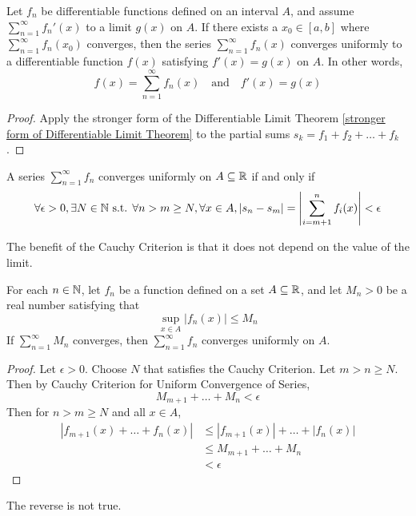\documentclass[11pt]{article}
\begin{document}
 Let $f_n$ be differentiable functions defined on an interval $A$, and assume $\sum_{n=1}^\infty f_n'(x)$  to a limit $g(x)$ on $A$. If there exists a  $x_0 \in [a,b]$ where $\sum_{n=1}^\infty f_n(x_0)$ converges, then the series $\sum_{n=1}^\infty f_n(x)$ converges uniformly to a differentiable function $f(x)$ satisfying $f'(x) = g(x)$ on $A$. In other words,
$$f(x) = \sum_{n=1}^\infty f_n(x) \quad \text{and} \quad f'(x) = g(x)$$
\begin{proof}
	Apply the stronger form of the Differentiable Limit Theorem \ref{stronger form of Differentiable Limit Theorem} to the partial sums $s_k = f_1 + f_2 + \hdots + f_k$.
\end{proof}

A series $\sum_{n=1}^\infty f_n$ converges uniformly on $A \subseteq \mathbb{R}$ if and only if
$$\forall \epsilon > 0, \exists N \in \mathbb{N} \text{ s.t. } \forall n > m \geq N, \forall x \in A, |s_n - s_{m}| = \left \vert {\sum_{i=m+1}^n f_i(x)} \right \vert < \epsilon$$

\remark
The benefit of the Cauchy Criterion is that it does not depend on the value of the limit.

 For each $n \in \mathbb{N}$, let $f_n$ be a function defined on a set $A \subseteq \mathbb{R}$, and let $M_n > 0$ be a real number satisfying that
$$\sup_{x \in A}|f_n(x)| \leq M_n$$
If $\sum_{n=1}^\infty M_n$ converges, then $\sum_{n=1}^\infty f_n$ converges uniformly on $A$.

\begin{proof}
	Let $\epsilon > 0$. Choose $N$ that satisfies the Cauchy Criterion. Let $m > n \geq N$.\\
	Then by Cauchy Criterion for Uniform Convergence of Series, 
	$$M_{m+1} + \hdots + M_n < \epsilon$$
	Then for $n > m \geq N$ and all $x \in A$,
	\begin{align*}
		|f_{m+1}(x) + \hdots + f_n(x)| &\leq |f_{m+1}(x)| + \hdots + |f_n(x)| \\
		&\leq M_{m+1} + \hdots + M_n \\
		&< \epsilon
	\end{align*}
	
\end{proof}

\remark
The reverse is not true.
\end{document}
